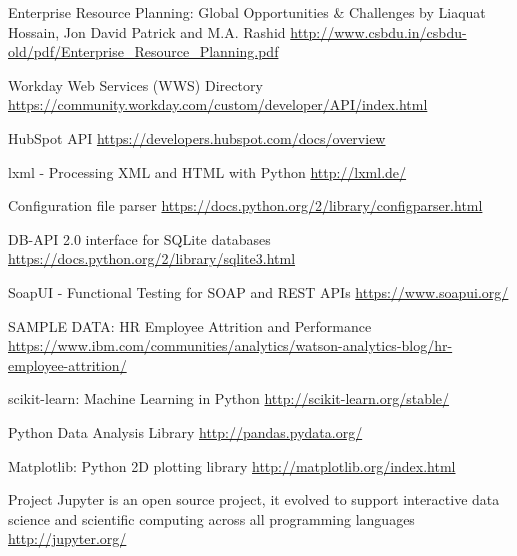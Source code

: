\begin{thebibliography}{9}
	
	
	Enterprise Resource Planning: Global Opportunities \& Challenges
	by Liaquat Hossain, Jon David Patrick and M.A. Rashid 
	\url{http://www.csbdu.in/csbdu-old/pdf/Enterprise_Resource_Planning.pdf}
	 
	Workday Web Services (WWS) Directory
	\url{https://community.workday.com/custom/developer/API/index.html}
	
	HubSpot API
	\url{https://developers.hubspot.com/docs/overview}
	
	lxml - Processing XML and HTML with Python
	\url{http://lxml.de/}
	 
	 
	Configuration file parser
	\url{https://docs.python.org/2/library/configparser.html}
	 
	
	DB-API 2.0 interface for SQLite databases
	\url{https://docs.python.org/2/library/sqlite3.html}
	
	SoapUI - Functional Testing for SOAP and REST APIs
	\url{https://www.soapui.org/}
	
	
	SAMPLE DATA: HR Employee Attrition and Performance
	\url{https://www.ibm.com/communities/analytics/watson-analytics-blog/hr-employee-attrition/}
	

	scikit-learn: Machine Learning in Python
	\url{http://scikit-learn.org/stable/}
	
	Python Data Analysis Library
	\url{http://pandas.pydata.org/}
	
	Matplotlib: Python 2D plotting library
	\url{http://matplotlib.org/index.html}
		
	Project Jupyter is an open source project, it evolved to support interactive data science and scientific computing across all programming languages
	\url{http://jupyter.org/}
	
	
	
\end{thebibliography}